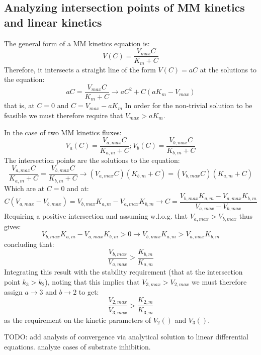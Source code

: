 \documentclass[a4page,notitlepage]{article}
\begin{document}
\subsection{Analyzing intersection points of MM kinetics and linear kinetics}
The general form of a MM kinetics equation is:
\[
V(C)=\frac{V_{max}C}{K_m+C}
\]
Therefore, it intersects a straight line of the form $V(C)=aC$ at the solutions to the equation:
\[
aC=\frac{V_{max}C}{K_m+C} \rightarrow aC^2+C(aK_m-V_{max})
\]
that is, at $C=0$ and $C=V_{max}-aK_m$
In order for the non-trivial solution to be feasible we must therefore require that $V_{max}>aK_m$.

In the case of two MM kinetics fluxes:
\[
V_a(C)=\frac{V_{a,max}C}{K_{a,m}+C};
V_b(C)=\frac{V_{b,max}C}{K_{b,m}+C}
\]
The intersection points are the solutions to the equation:
\[
\frac{V_{a,max}C}{K_{a,m}+C}=\frac{V_{b,max}C}{K_{b,m}+C} \rightarrow (V_{a,max}C)(K_{b,m}+C)=(V_{b,max}C)(K_{a,m}+C)
\]
Which are at $C=0$ and at:
\[
C(V_{a,max}-V_{b,max})=V_{b,max}K_{a,m}-V_{a,max}K_{b,m} \rightarrow C=\frac{V_{b,max}K_{a,m}-V_{a,max}K_{b,m}}{V_{a,max}-V_{b,max}}
\]
Requiring a positive intersection and assuming w.l.o.g. that $V_{a,max}>V_{b,max}$ thus gives:
\[
V_{b,max}K_{a,m}-V_{a,max}K_{b,m}>0 \rightarrow V_{b,max}K_{a,m}>V_{a,max}K_{b,m}
\]
concluding that:
\[
\frac{V_{b,max}}{V_{a,max}}>\frac{K_{b,m}}{K_{a,m}}
\]
Integrating this result with the stability requirement (that at the intersection point $k_3>k_2$), noting that this implies that $V_{3,max}>V_{2,max}$ we must therefore assign $a \rightarrow 3$ and $b \rightarrow 2$ to get:
\[
\frac{V_{2,max}}{V_{3,max}}>\frac{K_{2,m}}{K_{3,m}}
\]
as the requirement on the kinetic parameters of $V_2()$ and $V_3()$.

TODO: add analysis of convergence via analytical solution to linear differential equations.
analyze cases of substrate inhibition.
\end{document}
